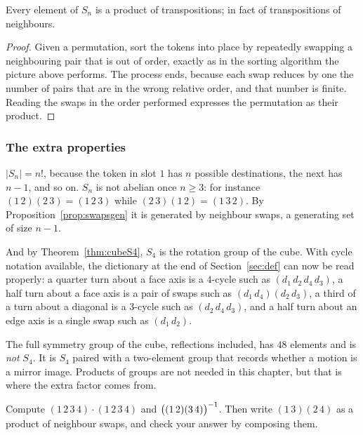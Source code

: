 
\begin{prop}\label{prop:swapsgen}
Every element of $S_n$ is a product of transpositions; in fact of transpositions of neighbours.
\end{prop}

\begin{proof}
Given a permutation, sort the tokens into place by repeatedly swapping a neighbouring pair that is
out of order, exactly as in the sorting algorithm the picture above performs. The process ends,
because each swap reduces by one the number of pairs that are in the wrong relative order, and that
number is finite. Reading the swaps in the order performed expresses the permutation as their
product.
\end{proof}

\subsubsection*{The extra properties}

$|S_n|=n!$, because the token in slot $1$ has $n$ possible destinations, the next has $n-1$, and so
on. $S_n$ is not abelian once $n\ge3$: for instance $(1\,2)(2\,3)=(1\,2\,3)$ while
$(2\,3)(1\,2)=(1\,3\,2)$. By Proposition~\ref{prop:swapsgen} it is generated by neighbour swaps, a
generating set of size $n-1$.

And by Theorem~\ref{thm:cubeS4}, $S_4$ is the rotation group of the cube. With cycle notation
available, the dictionary at the end of Section~\ref{sec:def} can now be read properly: a quarter
turn about a face axis is a $4$-cycle such as $(d_1\,d_2\,d_4\,d_3)$, a half turn about a face axis
is a pair of swaps such as $(d_1\,d_4)(d_2\,d_3)$, a third of a turn about a diagonal is a $3$-cycle
such as $(d_2\,d_4\,d_3)$, and a half turn about an edge axis is a single swap such as
$(d_1\,d_2)$.

\begin{rem}
The full symmetry group of the cube, reflections included, has $48$ elements and is \emph{not}
$S_4$. It is $S_4$ paired with a two-element group that records whether a motion is a mirror image.
Products of groups are not needed in this chapter, but that is where the extra factor comes from.
\end{rem}

\begin{tryit}
Compute $(1\,2\,3\,4)\cdot(1\,2\,3\,4)$ and $\big((1\,2)(3\,4)\big)^{-1}$. Then write
$(1\,3)(2\,4)$ as a product of neighbour swaps, and check your answer by composing them.
\end{tryit}
